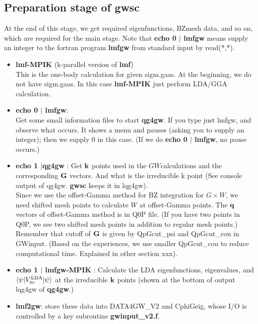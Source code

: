\documentclass[a4paper,10pt,epsf,fleqn]{article}
\newcommand{\GW}{$GW$}
\newcommand{\bfq}{{\bf q}}
\newcommand{\exe}[1]{{\bf #1}}
\newcommand{\io}[1]{{\sf  #1}}
\begin{document}
\subsection{\bf Preparation stage of \exe{gwsc}}
At the end of this stage, 
we get required eigenfunctions, BZmesh data, and so on,
which are required for the main stage.
Note that 
{\bf echo 0 $|$ lmfgw} means supply an integer to the fortran program
{\bf lmfgw} from standard input by read(*,*).
\begin{itemize}
\item \exe{lmf-MPIK} (k-parallel version of \exe{lmf})\\
This is the one-body calculation for given \io{sigm.gaas}.
At the beginning, we do not have \io{sigm.gaas}.
In this case \exe{lmf-MPIK} just perform LDA/GGA calculation. 
\item{\bf echo 0 $|$ lmfgw}: \\
  Get some small information files to start {\bf qg4gw}.
  If you type just lmfgw, and observe what occurs.
  It shows a menu and pauses (asking you to supply an integer); then
  we supply 0 in this case. (If we do {\bf echo 0 $|$ lmfgw}, no pause occurs.)
\item{\bf echo 1 $|$qg4gw }: Get ${\bf k}$ points used
  in the \GW calculations and the corresponding ${\bf G}$ vectors.
  And what is the irreducible k point (See console output of qg4gw.
  \exe{gwsc} keeps it in \io{lqg4gw}).\\
  Since we use the offset-Gamma method for BZ integration for $G \times W$,
  we need shifted mesh points to calculate $W$ at offset-Gamma points.
  The $\bfq$ vectors of offset-Gamma method is in \io{Q0P} file.
  (If you have two points in \io{Q0P}, we see two shifted mesh points in
   addition to regular mesh points.)
  Remember that cutoff of ${\bf G}$ is given by QpGcut\_psi and QpGcut\_cou
  in \io{GWinput}. (Based on the experiences, we use smaller QpGcut\_cou
  to reduce computational time. Explained in other section xxx).
\item{\bf echo 1 $|$ lmfgw-MPIK} : 
 Calculate the LDA eigenfunctions, eigenvalues, and
 $\langle \psi | V^{\rm LDA}_{\rm xc}| \psi \rangle$
 at the irreducible ${\bf k}$ points (shown at the bottom of output
     \io{lqg4gw} of \exe{qg4gw}.)
\item{\bf lmf2gw}: store these data into {\sf DATA4GW\_V2} and {\sf CphiGeig}, 
whose I/O is controlled by a key subroutine {\bf gwinput\_v2.f}.
\end{itemize}
\end{document}
